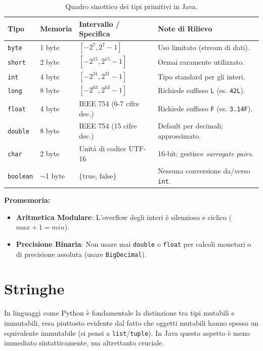 \begin{table}[ht!]
\centering
\renewcommand{\arraystretch}{1.2}
\begin{tabular}{@{}llll@{}}
\toprule
\textbf{Tipo} & \textbf{Memoria} & \textbf{Intervallo / Specifica} & \textbf{Note di Rilievo} \\ \midrule
\texttt{byte} & 1 byte & $[-2^{7}, 2^{7}-1]$ & Uso limitato (stream di dati). \\
\texttt{short} & 2 byte & $[-2^{15}, 2^{15}-1]$ & Ormai raramente utilizzato. \\
\texttt{int} & 4 byte & $[-2^{31}, 2^{31}-1]$ & Tipo standard per gli interi. \\
\texttt{long} & 8 byte & $[-2^{63}, 2^{63}-1]$ & Richiede suffisso \texttt{L} (es. \texttt{42L}). \\ \midrule
\texttt{float} & 4 byte & IEEE 754 (6-7 cifre dec.) & Richiede suffisso \texttt{F} (es. \texttt{3.14F}). \\
\texttt{double} & 8 byte & IEEE 754 (15 cifre dec.) & Default per decimali; approssimato. \\ \midrule
\texttt{char} & 2 byte & Unità di codice UTF-16 & 16-bit; gestisce \textit{surrogate pairs}. \\
\texttt{boolean} & $\sim$1 byte & $\{\text{true, false}\}$ & Nessuna conversione da/verso \texttt{int}. \\ \bottomrule
\end{tabular}
\caption{Quadro sinottico dei tipi primitivi in Java.}
\end{table}

\begin{warningbox}[]
\textbf{Promemoria:}
\begin{itemize}
    \item \textbf{Aritmetica Modulare}: L'overflow degli interi è silenzioso e ciclico ($max + 1 = min$).
    \item \textbf{Precisione Binaria}: Non usare mai \texttt{double} o \texttt{float} per calcoli monetari o di precisione assoluta (usare \texttt{BigDecimal}).
\end{itemize}
\end{warningbox}

\section{Stringhe}

In linguaggi come Python è fondamentale la distinzione tra tipi mutabili e immutabili, resa piuttosto evidente dal fatto che oggetti mutabili hanno spesso un equivalente immutabile (si pensi a \texttt{list}/\texttt{tuple}). In Java questo aspetto è meno immediato sintatticamente, ma altrettanto cruciale.

